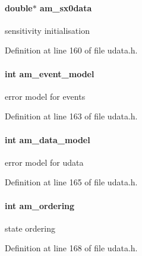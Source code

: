 \paragraph[{am\+\_\+sx0data}]{\setlength{\rightskip}{0pt plus 5cm}double$\ast$ am\+\_\+sx0data}\label{struct_user_data_a7ac27602345668b3a2bcabac4c7af733}
sensitivity initialisation 

Definition at line 160 of file udata.\+h.

\hypertarget{struct_user_data_ace3cae0f78a3365a5fac7d7daa9928ff}{}
\paragraph[{am\+\_\+event\+\_\+model}]{\setlength{\rightskip}{0pt plus 5cm}int am\+\_\+event\+\_\+model}\label{struct_user_data_ace3cae0f78a3365a5fac7d7daa9928ff}
error model for events 

Definition at line 163 of file udata.\+h.

\hypertarget{struct_user_data_a83373144a2adb9f97cdfca2dfc79ce80}{}
\paragraph[{am\+\_\+data\+\_\+model}]{\setlength{\rightskip}{0pt plus 5cm}int am\+\_\+data\+\_\+model}\label{struct_user_data_a83373144a2adb9f97cdfca2dfc79ce80}
error model for udata 

Definition at line 165 of file udata.\+h.

\hypertarget{struct_user_data_a260a14e35469f1516b194f4f065a9794}{}
\paragraph[{am\+\_\+ordering}]{\setlength{\rightskip}{0pt plus 5cm}int am\+\_\+ordering}\label{struct_user_data_a260a14e35469f1516b194f4f065a9794}
state ordering 

Definition at line 168 of file udata.\+h.

\hypertarget{struct_user_data_a822be7d2872832008aa0b7c0282b04f6}{}

